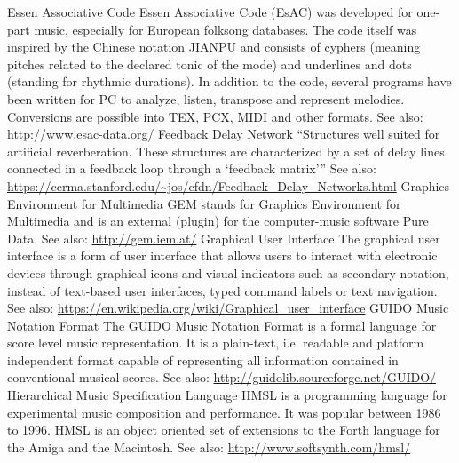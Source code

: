 	{Essen Associative Code}
	{Essen Associative Code (EsAC) was developed for one-part music, especially for European folksong databases. The code itself was inspired by the Chinese notation JIANPU and consists of cyphers (meaning pitches related to the declared tonic of the mode) and underlines and dots (standing for rhythmic durations). In addition to the code, several programs have been written for PC to analyze, listen, transpose and represent melodies.
Conversions are possible into TEX, PCX, MIDI and other formats. See also: \url{http://www.esac-data.org/}}
	{Feedback Delay Network}
	{``Structures well suited for artificial reverberation. These structures are characterized by a set of delay lines connected in a feedback loop through a `feedback matrix''' See also: \url{https://ccrma.stanford.edu/~jos/cfdn/Feedback_Delay_Networks.html}}
	{Graphics Environment for Multimedia}
	{GEM stands for Graphics Environment for Multimedia and is an external (plugin) for the computer-music software Pure Data. See also: \url{http://gem.iem.at/}}
	{Graphical User Interface}
	{The graphical user interface is a form of user interface that allows users to interact with electronic devices through graphical icons and visual indicators such as secondary notation, instead of text-based user interfaces, typed command labels or text navigation. See also: \url{https://en.wikipedia.org/wiki/Graphical_user_interface}}
	{GUIDO Music Notation Format}
	{The GUIDO Music Notation Format is a formal language for score level music representation. It is a plain-text, i.e. readable and platform independent format capable of representing all information contained in conventional musical scores. See also: \url{http://guidolib.sourceforge.net/GUIDO/}}
	{Hierarchical Music Specification Language}
	{HMSL is a programming language for experimental music composition and performance. It was popular between 1986 to 1996. HMSL is an object oriented set of extensions to the Forth language for the Amiga and the Macintosh. See also: \url{http://www.softsynth.com/hmsl/}}
